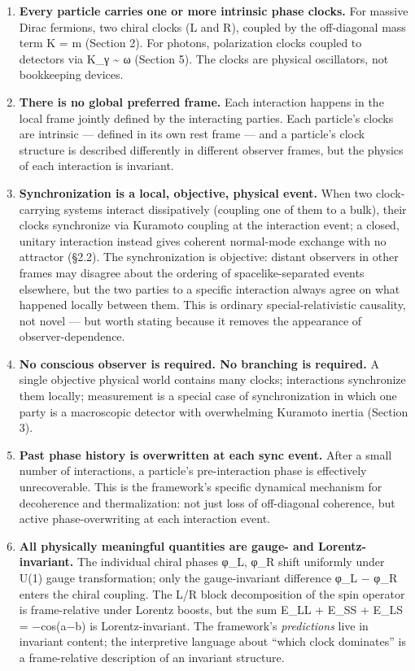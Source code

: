 \documentclass[
]{article}
\begin{document}
\begin{enumerate}
\def\labelenumi{\arabic{enumi}.}
\item
  \textbf{Every particle carries one or more intrinsic phase clocks.}
  For massive Dirac fermions, two chiral clocks (L and R), coupled by
  the off-diagonal mass term K = m (Section 2). For photons,
  polarization clocks coupled to detectors via K\_γ \textasciitilde{} ω
  (Section 5). The clocks are physical oscillators, not bookkeeping
  devices.
\item
  \textbf{There is no global preferred frame.} Each interaction happens
  in the local frame jointly defined by the interacting parties. Each
  particle's clocks are intrinsic --- defined in its own rest frame ---
  and a particle's clock structure is described differently in different
  observer frames, but the physics of each interaction is invariant.
\item
  \textbf{Synchronization is a local, objective, physical event.} When
  two clock-carrying systems interact dissipatively (coupling one of
  them to a bulk), their clocks synchronize via Kuramoto coupling at the
  interaction event; a closed, unitary interaction instead gives
  coherent normal-mode exchange with no attractor (§2.2). The
  synchronization is objective: distant observers in other frames may
  disagree about the ordering of spacelike-separated events elsewhere,
  but the two parties to a specific interaction always agree on what
  happened locally between them. This is ordinary special-relativistic
  causality, not novel --- but worth stating because it removes the
  appearance of observer-dependence.
\item
  \textbf{No conscious observer is required. No branching is required.}
  A single objective physical world contains many clocks; interactions
  synchronize them locally; measurement is a special case of
  synchronization in which one party is a macroscopic detector with
  overwhelming Kuramoto inertia (Section 3).
\item
  \textbf{Past phase history is overwritten at each sync event.} After a
  small number of interactions, a particle's pre-interaction phase is
  effectively unrecoverable. This is the framework's specific dynamical
  mechanism for decoherence and thermalization: not just loss of
  off-diagonal coherence, but active phase-overwriting at each
  interaction event.
\item
  \textbf{All physically meaningful quantities are gauge- and
  Lorentz-invariant.} The individual chiral phases φ\_L, φ\_R shift
  uniformly under U(1) gauge transformation; only the gauge-invariant
  difference φ\_L − φ\_R enters the chiral coupling. The L/R block
  decomposition of the spin operator is frame-relative under Lorentz
  boosts, but the sum E\_LL + E\_SS + E\_LS = −cos(a−b) is
  Lorentz-invariant. The framework's \emph{predictions} live in
  invariant content; the interpretive language about ``which clock
  dominates'' is a frame-relative description of an invariant structure.
\end{enumerate}
\end{document}
